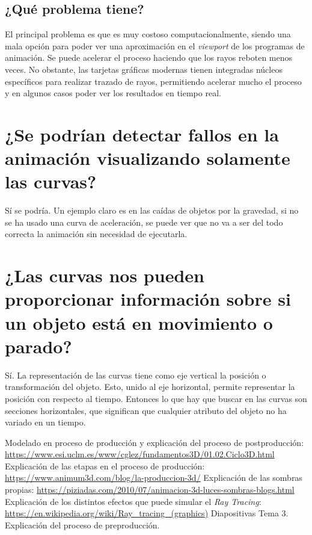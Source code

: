 \documentclass{article}
\begin{document}

\subsection{¿Qué problema tiene?}

El principal problema es que es muy costoso computacionalmente, siendo una mala opción para poder ver una aproximación en el \textit{viewport} de los programas de animación. Se puede acelerar el proceso haciendo que los rayos reboten menos veces. No obstante, las tarjetas gráficas modernas tienen integradas núcleos específicos para realizar trazado de rayos, permitiendo acelerar mucho el proceso y en algunos casos poder ver los resultados en tiempo real.


\section{¿Se podrían detectar fallos en la animación visualizando solamente las curvas?}

Sí se podría. Un ejemplo claro es en las caídas de objetos por la gravedad, si no se ha usado una curva de aceleración, se puede ver que no va a ser del todo correcta la animación sin necesidad de ejecutarla.

\section{¿Las curvas nos pueden proporcionar información sobre si un objeto está en movimiento o parado?}


Sí. La representación de las curvas tiene como eje vertical la posición o transformación del objeto. Esto, unido al eje horizontal, permite representar la posición con respecto al tiempo. Entonces lo que hay que buscar en las curvas son secciones horizontales, que significan que cualquier atributo del objeto no ha variado en un tiempo.

\begin{thebibliography}{1}
     Modelado en proceso de producción y explicación del proceso de postproducción: \url{https://www.esi.uclm.es/www/cglez/fundamentos3D/01.02.Ciclo3D.html}
     Explicación de las etapas en el proceso de producción: \url{https://www.animum3d.com/blog/la-produccion-3d/}
     Explicación de las sombras propias: \url{https://piziadas.com/2010/07/animacion-3d-luces-sombras-blogs.html}
     Explicación de los distintos efectos que puede simular el \textit{Ray Tracing}: \url{https://en.wikipedia.org/wiki/Ray_tracing_(graphics)}
     Diapositivas Tema 3. Explicación del proceso de preproducción.
\end{thebibliography}
\end{document}
